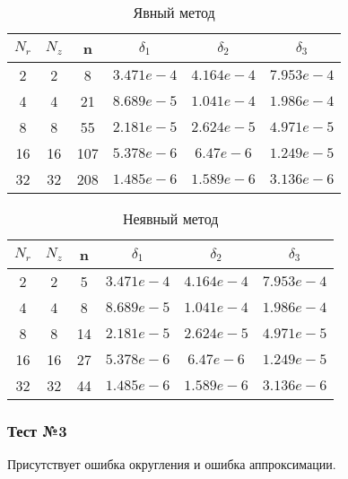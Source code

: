 \begin{table}[H]
  \begin{center}
    \begin{tabular}{*{6}c}
      \toprule
      $ N_r $ & $ N_z $ & n & $ \delta_1 $ & $ \delta_2 $ & $ \delta_3 $ \\
      \midrule
      2 & 2 & 8 & $3.471e-4 $ & $4.164e-4 $ & $7.953e-4 $ \\
      4 & 4 & 21 & $8.689e-5 $ & $1.041e-4 $ & $1.986e-4 $ \\
      8 & 8 & 55 & $2.181e-5 $ & $2.624e-5 $ & $4.971e-5 $ \\
      16 & 16 & 107 & $5.378e-6 $ & $6.47e-6 $ & $1.249e-5 $ \\
      32 & 32 & 208 & $1.485e-6 $ & $1.589e-6 $ & $3.136e-6 $ \\
      \bottomrule
    \end{tabular}
    \caption{Явный метод}
  \end{center}
  \end{table}
  
  \begin{table}[H]
    \begin{center}
      \begin{tabular}{*{6}c}
        \toprule
        $ N_r $ & $ N_z $ & n & $ \delta_1 $ & $ \delta_2 $ & $ \delta_3 $ \\
        \midrule
        2 & 2 & 5 & $3.471e-4 $ & $4.164e-4 $ & $7.953e-4 $  \\
        4 & 4 & 8 & $8.689e-5 $ & $1.041e-4 $ & $1.986e-4 $ \\
        8 & 8 & 14 & $2.181e-5 $ & $2.624e-5 $ & $4.971e-5 $ \\
        16 & 16 & 27 & $5.378e-6 $ & $6.47e-6 $ & $1.249e-5 $ \\
        32 & 32 & 44 & $1.485e-6 $ & $1.589e-6 $ & $3.136e-6 $ \\
        \bottomrule
      \end{tabular}
      \caption{Неявный метод}
    \end{center}
  \end{table}

\subsubsection*{Тест №3}

Присутствует ошибка округления и ошибка аппроксимации.

